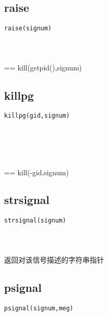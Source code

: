 \documentclass[10pt,a4paper]{article}
\begin{document}
\subsection{raise}
\begin{spacing}{2.0}
\lstset{language=C,numbers=none}
\begin{lstlisting}
raise(signum)
\end{lstlisting}
{\large\color[rgb]{0.2,0.4,0.6}{signum:}}
\paragraph{ \ \ }== kill(getpid(),signum)
\end{spacing}

\subsection{killpg}
\begin{spacing}{2.0}
\lstset{language=C,numbers=none}
\begin{lstlisting}
killpg(gid,signum)
\end{lstlisting}
{\large\color[rgb]{0.2,0.4,0.6}{gid:}} \\
{\large\color[rgb]{0.2,0.4,0.6}{signum:}}
\paragraph{ \ \ }== kill(-gid,signum)
\end{spacing}

\subsection{strsignal}
\begin{spacing}{2.0}
\lstset{language=C,numbers=none}
\begin{lstlisting}
strsignal(signum)
\end{lstlisting}
{\large\color[rgb]{0.2,0.4,0.6}{signum:}}
\paragraph{ \ \ }返回对该信号描述的字符串指针
\end{spacing}

\subsection{psignal}
\begin{spacing}{2.0}
\lstset{language=C,numbers=none}
\begin{lstlisting}
psignal(signum,meg)
\end{lstlisting}
{\large\color[rgb]{0.2,0.4,0.6}{signum:}} \\
{\large\color[rgb]{0.2,0.4,0.6}{meg:}}
\paragraph{ \ \ }
\end{spacing}
\end{document}
